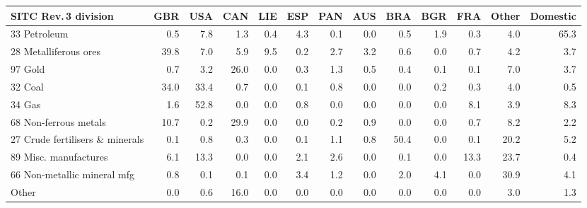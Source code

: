 \begin{tabular}{lrrrrrrrrrrrr}
\toprule
SITC Rev.\,3 division & GBR & USA & CAN & LIE & ESP & PAN & AUS & BRA & BGR & FRA & Other & Domestic \\
\midrule
33 Petroleum & 0.5 & 7.8 & 1.3 & 0.4 & 4.3 & 0.1 & 0.0 & 0.5 & 1.9 & 0.3 & 4.0 & 65.3 \\
28 Metalliferous ores & 39.8 & 7.0 & 5.9 & 9.5 & 0.2 & 2.7 & 3.2 & 0.6 & 0.0 & 0.7 & 4.2 & 3.7 \\
97 Gold & 0.7 & 3.2 & 26.0 & 0.0 & 0.3 & 1.3 & 0.5 & 0.4 & 0.1 & 0.1 & 7.0 & 3.7 \\
32 Coal & 34.0 & 33.4 & 0.7 & 0.0 & 0.1 & 0.8 & 0.0 & 0.0 & 0.2 & 0.3 & 4.0 & 0.5 \\
34 Gas & 1.6 & 52.8 & 0.0 & 0.0 & 0.8 & 0.0 & 0.0 & 0.0 & 0.0 & 8.1 & 3.9 & 8.3 \\
68 Non-ferrous metals & 10.7 & 0.2 & 29.9 & 0.0 & 0.0 & 0.2 & 0.9 & 0.0 & 0.0 & 0.7 & 8.2 & 2.2 \\
27 Crude fertilisers \& minerals & 0.1 & 0.8 & 0.3 & 0.0 & 0.1 & 1.1 & 0.8 & 50.4 & 0.0 & 0.1 & 20.2 & 5.2 \\
89 Misc. manufactures & 6.1 & 13.3 & 0.0 & 0.0 & 2.1 & 2.6 & 0.0 & 0.1 & 0.0 & 13.3 & 23.7 & 0.4 \\
66 Non-metallic mineral mfg & 0.8 & 0.1 & 0.1 & 0.0 & 3.4 & 1.2 & 0.0 & 2.0 & 4.1 & 0.0 & 30.9 & 4.1 \\
Other & 0.0 & 0.6 & 16.0 & 0.0 & 0.0 & 0.0 & 0.0 & 0.0 & 0.0 & 0.0 & 3.0 & 1.3 \\
\bottomrule
\end{tabular}
